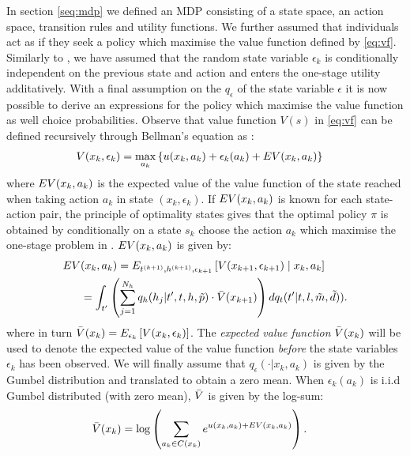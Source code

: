 In section \ref{seq:mdp} we defined an MDP consisting of a state space, an action space, transition rules and utility functions. We further assumed that individuals act as if they seek a policy which maximise the value function defined by \eqref{eq:vf}. Similarly to \citet{rust1987}, we have assumed that the random state variable $\epsilon_k$ is conditionally independent on the previous state and action and enters the one-stage utility additatively. With a final assumption on the $q_\epsilon$ of the state variable $\epsilon$ it is now possible to derive an expressions for the policy which maximise the value function as well choice probabilities.
Observe that value function $V(s)$ in \eqref{eq:vf} can be defined recursively through Bellman's equation as \citep{bellman,rust1987}:
\begin{equation} \label{eq:vfbellman}
\begin{aligned}
V(x_k,\epsilon_k) &= \max_{a_k} \left\{\avgu(x_k,a_k) + \epsilon_k(a_k)+ \eutil(x_k,a_k) \right\} 
\end{aligned}
\end{equation}
where $EV(x_k,a_k) $ is the expected value of the value function of the state reached when taking action $a_k$ in state $(x_k,\epsilon_k)$. If $EV(x_k,a_k)$ is known for each state-action pair, the principle of optimality states gives that the optimal policy $\pi$ is obtained by conditionally on a state $s_k$ choose the action $a_k$ which maximise the one-stage problem in . $EV(x_k,a_k) $ is given by: 
\begin{equation} \label{eq:eutil}
\begin{aligned}
	\eutil&(x_k,a_k)  = E_{t\ks{k+1},\amem\ks{k+1},\epsilon_{k+1}}\left[ V(x_{k+1},\epsilon_{k+1}) \mid x_k,a_k \right] \\
	&= \int_{t'} \left( \sum_{j=1}^{N_{\amem}}q_\amem(\amem_j|t', t,\amem,\act{p}) \cdot \ev(x_{k+1}) \right)dq_t(t'|t,l,\act{m},\act{d})).
	\end{aligned}
\end{equation}
where in turn $\bar{V}(x_k) = E_{\epsilon_k} \left[ V(x_k,\epsilon_k) \right]$.
The \emph{expected value function} $\bar{V}(x_k)$ will be used to denote the expected value of the value function \emph{before} the state variables $\epsilon_k$ has been observed.  We will finally assume that $q_\epsilon(\cdot|x_k,a_k)$ is given by the Gumbel distribution and translated to obtain a zero mean. When $\epsilon_k(a_k)$ is i.i.d Gumbel distributed (with zero mean), $\bar{V}$ is given by the log-sum:
\begin{equation} \label{eq:evfbellman}
\begin{aligned}
\ev(x_k) &= %
\log\left(\sum_{a_k\in C(x_{k})} e^{\avgu(x_k,a_k) + \eutil(x_k,a_k)}\right).
\end{aligned}
\end{equation}
